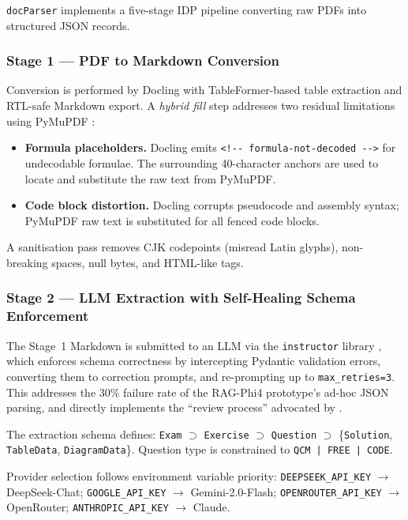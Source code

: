 \documentclass[12pt, a4paper]{article}
\begin{document}
\texttt{docParser} implements a five-stage IDP pipeline converting raw PDFs into
structured JSON records.

\subsubsection{Stage 1 --- PDF to Markdown Conversion}
\label{subsubsec:stage1}

Conversion is performed by Docling \cite{docling2024} with TableFormer-based
table extraction and RTL-safe Markdown export. A \textit{hybrid fill} step addresses
two residual limitations using PyMuPDF \cite{pymupdf2023}:

\begin{itemize}[leftmargin=2em]
  \item \textbf{Formula placeholders.} Docling emits
  \texttt{<!-{}-~formula-not-decoded~-{}-{}>} for undecodable formulae. The
  surrounding 40-character anchors are used to locate and substitute the raw text
  from PyMuPDF.
  \item \textbf{Code block distortion.} Docling corrupts pseudocode and assembly
  syntax; PyMuPDF raw text is substituted for all fenced code blocks.
\end{itemize}

A sanitisation pass removes CJK codepoints (misread Latin glyphs), non-breaking
spaces, null bytes, and HTML-like tags.

\subsubsection{Stage 2 --- LLM Extraction with Self-Healing Schema Enforcement}
\label{subsubsec:stage2}

The Stage~1 Markdown is submitted to an LLM via the \texttt{instructor} library
\cite{instructor2023}, which enforces schema correctness by intercepting Pydantic
validation errors, converting them to correction prompts, and re-prompting up to
\texttt{max\_retries=3}. This addresses the 30\% failure rate of the RAG-Phi4
prototype's ad-hoc JSON parsing, and directly implements the ``review process''
advocated by \citet{mucciaccia2025mcq}.

The extraction schema defines: \texttt{Exam} $\supset$ \texttt{Exercise} $\supset$
\texttt{Question} $\supset$ \{\texttt{Solution}, \texttt{TableData},
\texttt{DiagramData}\}. Question type is constrained to \texttt{QCM | FREE | CODE}.

Provider selection follows environment variable priority:
\texttt{DEEPSEEK\_API\_KEY} $\to$ DeepSeek-Chat;
\texttt{GOOGLE\_API\_KEY} $\to$ Gemini-2.0-Flash;
\texttt{OPENROUTER\_API\_KEY} $\to$ OpenRouter;
\texttt{ANTHROPIC\_API\_KEY} $\to$ Claude.
\end{document}
